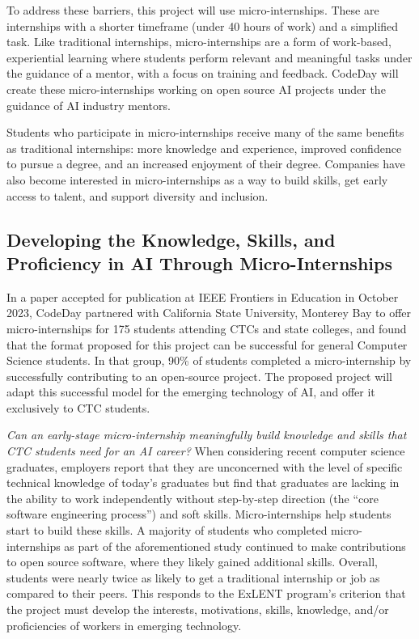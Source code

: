 To address these barriers, this project will use micro-internships. These are internships with a shorter timeframe (under 40 hours of work) and a simplified task.\cite{wingardWhyMicroInternshipsWill} Like traditional internships, micro-internships are a form of work-based, experiential learning where students perform relevant and meaningful tasks under the guidance of a mentor, with a focus on training and feedback.\cite{PowerWorkBasedLearning} CodeDay will create these micro-internships working on open source AI projects under the guidance of AI industry mentors.

Students who participate in micro-internships receive many of the same benefits as traditional internships: more knowledge and experience, improved confidence to pursue a degree, and an increased enjoyment of their degree.\cite{menezesWhatSkillsCS2023} Companies have also become interested in micro-internships as a way to build skills, get early access to talent, and support diversity and inclusion.\cite{mossMicroInternshipsPowerfulTool2019}

\subsection{Developing the Knowledge, Skills, and Proficiency in AI Through Micro-Internships}

In a paper accepted for publication at IEEE Frontiers in Education in October 2023, CodeDay partnered with California State University, Monterey Bay to offer micro-internships for 175 students attending CTCs and state colleges, and found that the format proposed for this project can be successful for general Computer Science students.\cite{narayananScalableApproachSupport2023} In that group, 90\% of students completed a micro-internship by successfully contributing to an open-source project. The proposed project will adapt this successful model for the emerging technology of AI, and offer it exclusively to CTC students.

\textit{Can an early-stage micro-internship meaningfully build knowledge and skills that CTC students need for an AI career?} When considering recent computer science graduates, employers report that they are unconcerned with the level of specific technical knowledge of today's graduates but find that graduates are lacking in the ability to work independently without step-by-step direction (the ``core software engineering process'') and soft skills.\cite{menezesWhatSkillsCS2023} Micro-internships help students start to build these skills. A majority of students who completed micro-internships as part of the aforementioned study continued to make contributions to open source software, where they likely gained additional skills. Overall, students were nearly twice as likely to get a traditional internship or job as compared to their peers. This responds to the ExLENT program’s criterion that the project must develop the interests, motivations, skills, knowledge, and/or proficiencies of workers in emerging technology.

